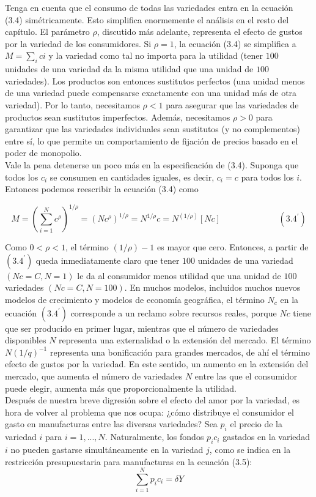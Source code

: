 Tenga en cuenta que el consumo de todas las variedades entra en la ecuación (3.4) simétricamente. Esto simplifica enormemente el análisis en el resto del capítulo. El parámetro $\rho$, discutido más adelante, representa el efecto de gustos por la variedad de los consumidores. Si $\rho = 1$, la ecuación (3.4) se simplifica a $M = \sum_i ci$ y la variedad como tal no importa para la utilidad (tener $100$ unidades de una variedad da la misma utilidad que una unidad de $100$ variedades). Los productos son entonces sustitutos perfectos (una unidad menos de una variedad puede compensarse exactamente con una unidad más de otra variedad). Por lo tanto, necesitamos $\rho < 1$ para asegurar que las variedades de productos sean sustitutos imperfectos. Además, necesitamos $\rho > 0$ para garantizar que las variedades individuales sean sustitutos (y no complementos) entre sí, lo que permite un comportamiento de fijación de precios basado en el poder de monopolio.\\
Vale la pena detenerse un poco más en la especificación de (3.4). Suponga que todos los $c_i$ se consumen en cantidades iguales, es decir, $c_i= c$ para todos los $i$. Entonces podemos reescribir la ecuación (3.4) como

$$M=\left(\sum_{i=1}^N c^\rho\right)^{1/\rho} = (Nc^\rho)^{1/\rho} = N^{1/\rho} c = N^{(1/\rho)}[Nc] \qquad \hspace{2cm} (3.4^{'})$$

Como $0 < \rho < 1$, el término $(1/\rho)- 1$ es mayor que cero. Entonces, a partir de $(3.4^{'})$ queda inmediatamente claro que tener $100$ unidades de una variedad $(Nc = C, N = 1)$ le da al consumidor menos utilidad que una unidad de $100$ variedades $(Nc = C, N = 100)$. En muchos modelos, incluidos muchos nuevos modelos de crecimiento y modelos de economía geográfica, el término $N_c$ en la ecuación $(3.4^{'})$ corresponde a un reclamo sobre recursos reales, porque $Nc$ tiene que ser producido en primer lugar, mientras que el número de variedades disponibles $N$ representa una externalidad o la extensión del mercado. El término $N(1/q)^{-1}$ representa una bonificación para grandes mercados, de ahí el término efecto de gustos por la variedad. En este sentido, un aumento en la extensión del mercado, que aumenta el número de variedades $N$ entre las que el consumidor puede elegir, aumenta más que proporcionalmente la utilidad.\\
Después de nuestra breve digresión sobre el efecto del amor por la variedad, es hora de volver al problema que nos ocupa: ¿cómo distribuye el consumidor el gasto en manufacturas entre las diversas variedades? Sea $p_i$ el precio de la variedad $i$ para $i = 1, . . . , N$. Naturalmente, los fondos $p_ic_i$ gastados en la variedad $i$ no pueden gastarse simultáneamente en la variedad $j$, como se indica en la restricción presupuestaria para manufacturas en la ecuación (3.5): 
\begin{equation}
    \sum_{i=1}^N p_i c_i = \delta Y
\end{equation}

